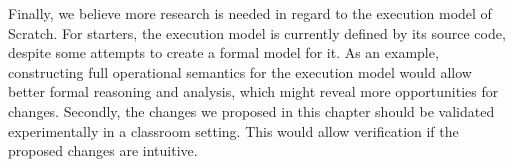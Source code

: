 \documentclass[main]{subfiles}
\begin{document}
Finally, we believe more research is needed in regard to the execution model of Scratch.
For starters, the execution model is currently defined by its source code, despite some attempts to create a formal model for it.
As an example, constructing full operational semantics for the execution model would allow better formal reasoning and analysis, which might reveal more opportunities for changes.
Secondly, the changes we proposed in this chapter should be validated experimentally in a classroom setting.
This would allow verification if the proposed changes are intuitive.

%
%
\end{document}
